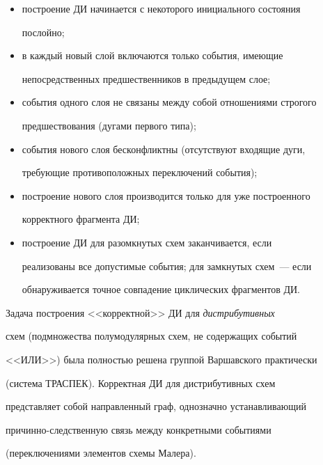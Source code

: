       \begin{itemize}


\item   построение ДИ начинается с некоторого инициального состояния 


послойно;


\item   в каждый новый слой включаются только события, имеющие 


непосредственных предшественников в предыдущем слое;


\item  события одного слоя не связаны между собой отношениями строгого 


предшествования (дугами первого типа);


\item  события нового слоя бесконфликтны (отсутствуют входящие дуги, 


тре\-бу\-ющие противоположных переключений события);


\item  построение нового слоя производится только для уже построенного 


корректного фрагмента ДИ;


\item   построение ДИ для разомкнутых схем заканчивается, если 


реализованы все допустимые события; для замкнутых схем~--- если 


обнаруживается точное совпадение циклических фрагментов ДИ.


\end{itemize}





      Задача построения <<корректной>> ДИ для \textit{дистрибутивных} 


схем  (подмножества полумодулярных схем, не содержащих событий 


<<ИЛИ>>) была полностью решена группой Варшавского практически 


      (сис\-те\-ма ТРАСПЕК). Корректная ДИ для дистрибутивных схем 


представляет собой направленный граф, однозначно устанавливающий 


причинно-следственную связь между конкретными событиями 


(переключениями элементов схемы Малера).  


      


